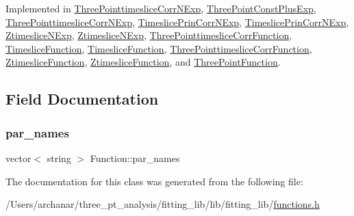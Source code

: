 Implemented in \mbox{\hyperlink{classThreePointtimesliceCorrNExp_a4d3143ae44c362e4dae6221ace8f1c02}{Three\+Pointtimeslice\+Corr\+N\+Exp}}, \mbox{\hyperlink{classThreePointConstPlusExp_aabb955a37221d2dc9cff3528a1564584}{Three\+Point\+Const\+Plus\+Exp}}, \mbox{\hyperlink{classThreePointtimesliceCorrNExp_a4d3143ae44c362e4dae6221ace8f1c02}{Three\+Pointtimeslice\+Corr\+N\+Exp}}, \mbox{\hyperlink{classTimeslicePrinCorrNExp_a9a55af8256beba8993e5163bdab55571}{Timeslice\+Prin\+Corr\+N\+Exp}}, \mbox{\hyperlink{classTimeslicePrinCorrNExp_a9a55af8256beba8993e5163bdab55571}{Timeslice\+Prin\+Corr\+N\+Exp}}, \mbox{\hyperlink{classZtimesliceNExp_af9ac01b3a80221dd8bf1a0a11cbdbb66}{Ztimeslice\+N\+Exp}}, \mbox{\hyperlink{classZtimesliceNExp_af9ac01b3a80221dd8bf1a0a11cbdbb66}{Ztimeslice\+N\+Exp}}, \mbox{\hyperlink{classThreePointtimesliceCorrFunction_af4198f5c0d9085c5dcc8d79447d54348}{Three\+Pointtimeslice\+Corr\+Function}}, \mbox{\hyperlink{classTimesliceFunction_ac4426035b36872933c70b5e0ad8cb4e3}{Timeslice\+Function}}, \mbox{\hyperlink{classTimesliceFunction_ac4426035b36872933c70b5e0ad8cb4e3}{Timeslice\+Function}}, \mbox{\hyperlink{classThreePointtimesliceCorrFunction_af4198f5c0d9085c5dcc8d79447d54348}{Three\+Pointtimeslice\+Corr\+Function}}, \mbox{\hyperlink{classZtimesliceFunction_ae7851ae590054311c69cdafc8f7ed621}{Ztimeslice\+Function}}, \mbox{\hyperlink{classZtimesliceFunction_ae7851ae590054311c69cdafc8f7ed621}{Ztimeslice\+Function}}, and \mbox{\hyperlink{classThreePointFunction_a02550dd7bdee83aab6967d304bb40ff1}{Three\+Point\+Function}}.



\subsection{Field Documentation}
\mbox{\label{classFunction_abe956c2e0616da26f188cccfd1df1203}} 
\subsubsection{\texorpdfstring{par\_names}{par\_names}}
{\footnotesize\ttfamily vector$<$ string $>$ Function\+::par\+\_\+names\hspace{0.3cm}{\ttfamily [protected]}}



The documentation for this class was generated from the following file\+:\begin{DoxyCompactItemize}
\item 
/\+Users/archanar/three\+\_\+pt\+\_\+analysis/fitting\+\_\+lib/lib/fitting\+\_\+lib/\mbox{\hyperlink{lib_2fitting__lib_2functions_8h}{functions.\+h}}\end{DoxyCompactItemize}
